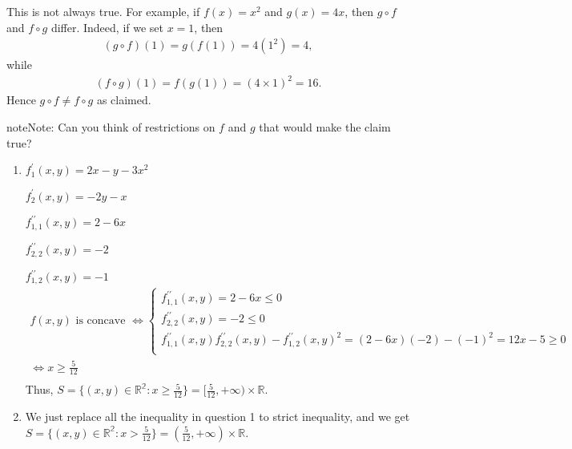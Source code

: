 \documentclass[letterpaper,10pt,english]{jupyterBook}
\begin{document}
\sphinxAtStartPar
{}

\sphinxAtStartPar
This is not always true. For example, if \(f(x) = x^2\) and
\(g(x) = 4x\), then \(g \circ f\) and \(f \circ g\) differ. Indeed, if we set
\(x=1\), then
\begin{equation*}
\begin{split}
(g \circ f)(1) = g(f(1)) = 4(1^2) = 4,
\end{split}
\end{equation*}
\sphinxAtStartPar
while
\begin{equation*}
\begin{split}
(f \circ g)(1) = f(g(1)) = (4 \times 1)^2 = 16.
\end{split}
\end{equation*}
\sphinxAtStartPar
Hence \(g \circ f \not= f \circ g\) as claimed.

\begin{sphinxadmonition}{note}{Note:}
\sphinxAtStartPar
Can you think of restrictions on \(f\) and \(g\) that would make the claim true?
\end{sphinxadmonition}

\sphinxAtStartPar
{}
\begin{enumerate}
%
\item {} 
\sphinxAtStartPar
\(f^{\prime}_{1}(x, y) = 2x - y -3x^2\)

\sphinxAtStartPar
\(f^{\prime}_{2}(x, y) = -2y - x\)

\sphinxAtStartPar
\(f^{\prime\prime}_{1, 1}(x, y) = 2 - 6x\)

\sphinxAtStartPar
\(f^{\prime\prime}_{2, 2}(x, y) = -2\)

\sphinxAtStartPar
\(f^{\prime\prime}_{1, 2}(x, y) = -1\)
\begin{equation*}
\begin{split}
   f(x, y) \text{ is concave } \iff
   \begin{cases}
    f^{\prime\prime}_{1, 1}(x, y) = 2 - 6x \leq 0 \\
    f^{\prime\prime}_{2, 2}(x, y) = -2 \leq 0 \\
    f^{\prime\prime}_{1, 1}(x, y) f^{\prime\prime}_{2, 2}(x, y) - f^{\prime\prime}_{1, 2}(x, y)^2 = (2 - 6x)(-2) - (-1)^2 = 12x - 5 \geq 0 \\
   \end{cases} \\
   \iff x \geq \frac{5}{12}\\
   \end{split}
\end{equation*}
\sphinxAtStartPar
Thus, \(S = \{(x, y) \in \mathbb{R^2}: x \geq \frac{5}{12}\}= [\frac{5}{12}, +\infty) \times \mathbb{R}\).

\item {} 
\sphinxAtStartPar
We just replace all the inequality in question 1 to strict inequality, and we get \(S = \{(x, y) \in \mathbb{R^2}: x > \frac{5}{12}\}= (\frac{5}{12}, +\infty) \times \mathbb{R}\).

\end{enumerate}
\end{document}
